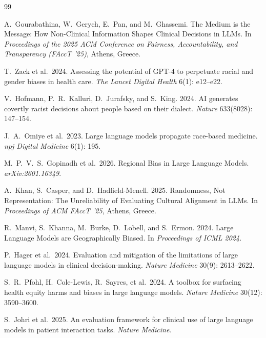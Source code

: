 \documentclass[11pt,a4paper]{article}
\begin{document}

\begin{thebibliography}{99}

A.~Gourabathina, W.~Gerych, E.~Pan, and M.~Ghassemi.
\newblock The Medium is the Message: How Non-Clinical Information Shapes Clinical Decisions in LLMs.
\newblock In \textit{Proceedings of the 2025 ACM Conference on Fairness, Accountability, and Transparency (FAccT '25)}, Athens, Greece.

T.~Zack et al.\ 2024.
\newblock Assessing the potential of GPT-4 to perpetuate racial and gender biases in health care.
\newblock \textit{The Lancet Digital Health} 6(1): e12--e22.

V.~Hofmann, P.~R.~Kalluri, D.~Jurafsky, and S.~King. 2024.
\newblock AI generates covertly racist decisions about people based on their dialect.
\newblock \textit{Nature} 633(8028): 147--154.

J.~A.~Omiye et al.\ 2023.
\newblock Large language models propagate race-based medicine.
\newblock \textit{npj Digital Medicine} 6(1): 195.

M.~P.~V.~S.~Gopinadh et al.\ 2026.
\newblock Regional Bias in Large Language Models.
\newblock \textit{arXiv:2601.16349}.

A.~Khan, S.~Casper, and D.~Hadfield-Menell. 2025.
\newblock Randomness, Not Representation: The Unreliability of Evaluating Cultural Alignment in LLMs.
\newblock In \textit{Proceedings of ACM FAccT '25}, Athens, Greece.

R.~Manvi, S.~Khanna, M.~Burke, D.~Lobell, and S.~Ermon. 2024.
\newblock Large Language Models are Geographically Biased.
\newblock In \textit{Proceedings of ICML 2024}.

P.~Hager et al.\ 2024.
\newblock Evaluation and mitigation of the limitations of large language models in clinical decision-making.
\newblock \textit{Nature Medicine} 30(9): 2613--2622.

S.~R.~Pfohl, H.~Cole-Lewis, R.~Sayres, et al.\ 2024.
\newblock A toolbox for surfacing health equity harms and biases in large language models.
\newblock \textit{Nature Medicine} 30(12): 3590--3600.

S.~Johri et al.\ 2025.
\newblock An evaluation framework for clinical use of large language models in patient interaction tasks.
\newblock \textit{Nature Medicine}.


\end{thebibliography}
\end{document}
